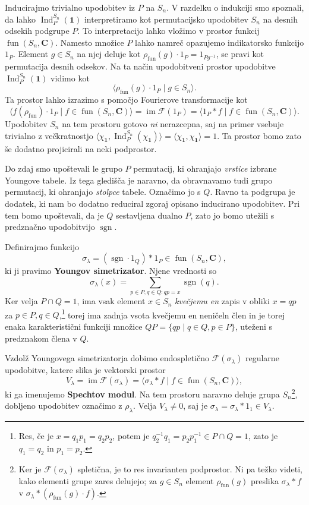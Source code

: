 \documentclass[11pt]{book}
\def\CC{\mathbf{C}}
\def\oneone{\mathbf{1}}
\def\Fcal{\mathcal{F}}
\def\youngsym{\sigma_{\lambda}}
\DeclareMathOperator\image{im}
\DeclareMathOperator\sgn{sgn}
\DeclareMathOperator\Ind{Ind}
\DeclareMathOperator\fun{fun}
\def\definicija{\color{rdeca}\bf}
\theoremstyle{definition}
\theoremstyle{zgled}
\theoremstyle{zgledbrezstevilke}
\theoremstyle{odprtproblem}
\theoremstyle{domacanaloga}
\theoremstyle{izrek}
\begin{document}
Inducirajmo trivialno upodobitev iz $P$ na $S_n$. V razdelku o indukciji smo spoznali, da lahko $\Ind^{S_n}_{P}(\oneone)$ interpretiramo kot permutacijsko upodobitev $S_n$ na desnih odsekih podgrupe $P$. To interpretacijo lahko vložimo v prostor funkcij $\fun(S_n, \CC)$. Namesto množice $P$ lahko namreč opazujemo indikatorsko funkcijo $1_P$. Element $g \in S_n$ na njej deluje kot
$\rho_{\fun}(g) \cdot 1_P = 1_{P g^{-1}}$, se pravi kot permutacija desnih odsekov. Na ta način upodobitveni prostor upodobitve $\Ind^{S_n}_{P}(\oneone)$ vidimo kot 
\[
    \langle \rho_{\fun}(g) \cdot 1_{P} \mid g \in S_n \rangle.
\]
Ta prostor lahko izrazimo s pomočjo Fourierove transformacije kot
\[
    \langle \hat{f}(\rho_{\fun}) \cdot 1_P \mid f \in \fun(S_n, \CC) \rangle
    = \image \Fcal(1_P)
    = \langle 1_P * f \mid f \in \fun(S_n, \CC) \rangle.    
\]
Upodobitev $S_n$ na tem prostoru gotovo \emph{ni} nerazcepna, saj na primer vsebuje trivialno z večkratnostjo $\langle \chi_{\oneone}, \Ind^{S_n}_{P}(\chi_{\oneone}) \rangle = \langle \chi_{\oneone}, \chi_{\oneone} \rangle = 1$. Ta prostor bomo zato še dodatno projicirali na neki podprostor.

Do zdaj smo upoštevali le grupo $P$ permutacij, ki ohranjajo \emph{vrstice} izbrane Youngove tabele. Iz tega gledišča je naravno, da obravnavamo tudi grupo permutacij, ki ohranjajo \emph{stolpce} tabele. Označimo jo s $Q$. Ravno ta podgrupa je dodatek, ki nam bo dodatno reduciral zgoraj opisano inducirano upodobitev. Pri tem bomo upoštevali, da je $Q$ sestavljena dualno $P$, zato jo bomo utežili s predznačno upodobitvijo $\sgn$.

Definirajmo funkcijo
\[
    \youngsym = (\sgn \cdot 1_Q) * 1_P \in \fun(S_n, \CC),
\]
ki ji pravimo {\definicija Youngov simetrizator}. Njene vrednosti so
\[
    \youngsym(x) = \sum_{p \in P, q \in Q \colon qp = x} \sgn(q).
\]
Ker velja $P \cap Q = 1$, ima vsak element $x \in S_n$ \emph{kvečjemu en} zapis v obliki $x = qp$ za $p \in P, q \in Q$,\footnote{Res, če je $x = q_1 p_1 = q_2 p_2$, potem je $q_2^{-1} q_1 = p_2 p_1^{-1} \in P \cap Q = 1$, zato je $q_1 = q_2$ in $p_1 = p_2$.} torej ima zadnja vsota kvečjemu en neničeln člen in je torej enaka karakteristični funkciji množice $QP = \{ qp \mid q \in Q, p \in P \}$, uteženi s predznakom člena v $Q$.

Vzdolž Youngovega simetrizatorja dobimo endospletično $\Fcal(\youngsym)$ regularne upodobitve, katere slika je vektorski prostor
\[
    V_{\lambda} = \image \Fcal(\youngsym) = \langle \youngsym * f \mid f \in \fun(S_n, \CC) \rangle,
\]
ki ga imenujemo {\definicija Spechtov modul}. Na tem prostoru naravno deluje grupa $S_n$\footnote{Ker je $\Fcal(\youngsym)$ spletična, je to res invarianten podprostor. Ni pa težko videti, kako elementi grupe zares delujejo; za $g \in S_n$ element $\rho_{\fun}(g)$ preslika $\youngsym * f$ v $\youngsym * (\rho_{\fun}(g) \cdot f)$.}, dobljeno upodobitev označimo z $\rho_{\lambda}$. Velja $V_{\lambda} \neq 0$, saj je $\youngsym = \youngsym * 1_1 \in V_{\lambda}$.
\end{document}
